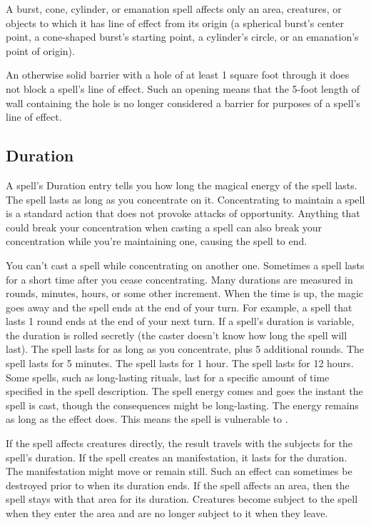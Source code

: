 A burst, cone, cylinder, or emanation spell affects only an area, creatures, or objects to which it has line of effect from its origin (a spherical burst's center point, a cone-shaped burst's starting point, a cylinder's circle, or an emanation's point of origin).

An otherwise solid barrier with a hole of at least 1 square foot through it does not block a spell's line of effect. Such an opening means that the 5-foot length of wall containing the hole is no longer considered a barrier for purposes of a spell's line of effect.

\subsection{Duration}
A spell's Duration entry tells you how long the magical energy of the spell lasts.
 The spell lasts as long as you concentrate on it. Concentrating to maintain a spell is a standard action that does not provoke attacks of opportunity. Anything that could break your concentration when casting a spell can also break your concentration while you're maintaining one, causing the spell to end.

You can't cast a spell while concentrating on another one. Sometimes a spell lasts for a short time after you cease concentrating.
 Many durations are measured in rounds, minutes, hours, or some other increment. When the time is up, the magic goes away and the spell ends at the end of your turn. For example, a spell that lasts 1 round ends at the end of your next turn. If a spell's duration is variable, the duration is rolled secretly (the caster doesn't know how long the spell will last).
 The spell lasts for as long as you concentrate, plus 5 additional rounds.
 The spell lasts for 5 minutes.
 The spell lasts for 1 hour.
 The spell lasts for 12 hours.
 Some spells, such as long-lasting rituals, last for a specific amount of time specified in the spell description.
 The spell energy comes and goes the instant the spell is cast, though the consequences might be long-lasting.
 The energy remains as long as the effect does. This means the spell is vulnerable to .

 If the spell affects creatures directly, the result travels with the subjects for the spell's duration. If the spell creates an manifestation, it lasts for the duration. The manifestation might move or remain still. Such an effect can sometimes be destroyed prior to when its duration ends. If the spell affects an area, then the spell stays with that area for its duration. Creatures become subject to the spell when they enter the area and are no longer subject to it when they leave.

